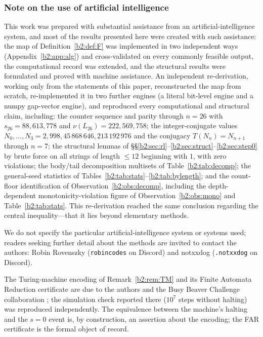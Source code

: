 \documentclass[a4paper]{article}
\theoremstyle{plain}
\theoremstyle{definition}
\theoremstyle{remark}
\begin{document}
\subsubsection{Note on the use of artificial intelligence}\label{b2:app:ai}
This work was prepared with substantial assistance from an artificial-intelligence system, and most of the results presented here were created with such assistance: the map of Definition~\ref{b2:def:F} was implemented in two independent ways (Appendix~\ref{b2:app:alg}) and cross-validated on every commonly feasible output, the computational record was extended, and the structural results were formulated and proved with machine assistance. An independent re-derivation, working only from the statements of this paper, reconstructed the map from scratch, re-implemented it in two further engines (a literal bit-level engine and a numpy gap-vector engine), and reproduced every computational and structural claim, including: the counter sequence and parity through $n=26$ with $s_{26}=88{,}613{,}778$ and $\nu(L_{26})=222{,}569{,}758$; the integer-conjugate values $N_0,\dots,N_3=2,998,45\,868\,646,213\,192\,976$ and the conjugacy $T(N_n)=N_{n+1}$ through $n=7$; the structural lemmas of \S\S\ref{b2:sec:rl}--\ref{b2:sec:struct}--\ref{b2:sec:step0} by brute force on all strings of length $\le 12$ beginning with $1$, with zero violations; the body/tail decomposition multisets of Table~\ref{b2:tab:decomp}; the general-seed statistics of Tables~\ref{b2:tab:stats}--\ref{b2:tab:bylength}; and the count-floor identification of Observation~\ref{b2:obs:decomp}, including the depth-dependent monotonicity-violation figure of Observation~\ref{b2:obs:mono} and Table~\ref{b2:tab:stats}. This re-derivation reached the same conclusion regarding the central inequality---that it lies beyond elementary methods.

We do not specify the particular artificial-intelligence system or systems used; readers seeking further detail about the methods are invited to contact the authors: Robin Rovenszky (\texttt{robincodes} on Discord) and notxxdog (\texttt{.notxxdog} on Discord).

The Turing-machine encoding of Remark~\ref{b2:rem:TM} and its Finite Automata Reduction certificate are due to the authors and the Busy Beaver Challenge collaboration \cite{b2:bbc}; the simulation check reported there ($10^7$ steps without halting) was reproduced independently. The equivalence between the machine's halting and the $s=0$ event is, by construction, an assertion about the encoding; the FAR certificate is the formal object of record.
\end{document}
